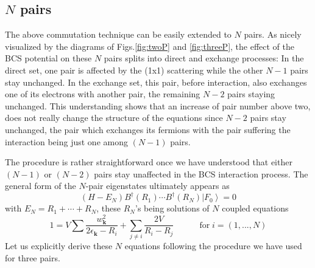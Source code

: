 \documentclass[epj]{svjour}
\begin{document}
\subsection{$N$ pairs}

The above commutation technique can be easily extended to $N$ pairs. As nicely
visualized by the diagrams of Figs.\ref{fig:twoP} and \ref{fig:threeP}, the
effect of the BCS potential on these $N$ pairs splits into direct and exchange processes:
In the direct set, one pair is affected by the (1x1) scattering while the other $N-1
$ pairs stay unchanged. In the exchange set, this pair, before interaction, also 
exchanges one of its electrons with another pair, the remaining $N-2$
pairs staying unchanged. This understanding shows that an increase of pair number above two, does not really change the structure of the equations
since $N-2$ pairs stay unchanged, the pair which exchanges its fermions with the
pair suffering the interaction being just one among $(N-1)$ pairs.

The procedure is rather straightforward once we have understood
that either $(N-1)$ or $(N-2)$ pairs stay unaffected in the BCS interaction process. The
general form of the $N$-pair eigenstates ultimately appears as 
\begin{equation}  \label{eq:SchThreeN}
(H-E _N)B^{\dagger}(R_1)\cdots{}B^{\dagger}(R_N)\left|F_0\right>  =0
\end{equation}
with $E _N=R_1+\cdots+R_N$, these $R_N$'s being solutions of $N$ coupled
equations 
\begin{equation}
1=V\sum\frac{w_{\mathbf{k} }^2}{2\epsilon_{\mathbf{k} }-R_i}+\sum_{j\neq{i}}%
\frac{2V}{R_i-R_j}\quad\qquad \text{for}\; i=\left(1,...,N\right) 
\end{equation}
Let us explicitly derive these $N$ equations following the procedure we have used for three pairs. 
\end{document}
